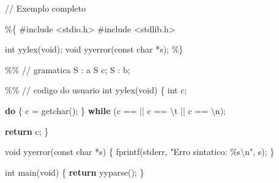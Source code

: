 \documentclass[
  brazilian,
  letterpaper,
]{book}
\newenvironment{Shaded}{\begin{snugshade}}{\end{snugshade}}
\newcommand{\AttributeTok}[1]{\textcolor[rgb]{0.40,0.45,0.13}{#1}}
\newcommand{\BaseNTok}[1]{\textcolor[rgb]{0.68,0.00,0.00}{#1}}
\newcommand{\CharTok}[1]{\textcolor[rgb]{0.13,0.47,0.30}{#1}}
\newcommand{\CommentTok}[1]{\textcolor[rgb]{0.37,0.37,0.37}{#1}}
\newcommand{\ControlFlowTok}[1]{\textcolor[rgb]{0.00,0.23,0.31}{\textbf{#1}}}
\newcommand{\DataTypeTok}[1]{\textcolor[rgb]{0.68,0.00,0.00}{#1}}
\newcommand{\ImportTok}[1]{\textcolor[rgb]{0.00,0.46,0.62}{#1}}
\newcommand{\NormalTok}[1]{\textcolor[rgb]{0.00,0.23,0.31}{#1}}
\newcommand{\OperatorTok}[1]{\textcolor[rgb]{0.37,0.37,0.37}{#1}}
\newcommand{\PreprocessorTok}[1]{\textcolor[rgb]{0.68,0.00,0.00}{#1}}
\newcommand{\SpecialCharTok}[1]{\textcolor[rgb]{0.37,0.37,0.37}{#1}}
\newcommand{\StringTok}[1]{\textcolor[rgb]{0.13,0.47,0.30}{#1}}
\theoremstyle{plain}
\theoremstyle{definition}
\theoremstyle{remark}
\begin{document}
\begin{Shaded}
\begin{Highlighting}[]
\CommentTok{// Exemplo completo}

\BaseNTok{\%\{}
\PreprocessorTok{\#include }\ImportTok{\textless{}stdio.h\textgreater{}}
\PreprocessorTok{\#include }\ImportTok{\textless{}stdlib.h\textgreater{}}

\DataTypeTok{int}\NormalTok{ yylex}\OperatorTok{(}\DataTypeTok{void}\OperatorTok{);}
\DataTypeTok{void}\NormalTok{ yyerror}\OperatorTok{(}\AttributeTok{const} \DataTypeTok{char} \OperatorTok{*}\NormalTok{s}\OperatorTok{);}
\BaseNTok{\%\}}

\BaseNTok{\%\%}
\CommentTok{// gramatica}
\StringTok{S }\NormalTok{: }\CharTok{\textquotesingle{}a\textquotesingle{}}\NormalTok{ S }\CharTok{\textquotesingle{}c\textquotesingle{}}\NormalTok{;}
\StringTok{S }\NormalTok{: }\CharTok{\textquotesingle{}b\textquotesingle{}}\NormalTok{;}

\BaseNTok{\%\%}
\CommentTok{// codigo do usuario}
\DataTypeTok{int}\NormalTok{ yylex}\OperatorTok{(}\DataTypeTok{void}\OperatorTok{)} \OperatorTok{\{}
    \DataTypeTok{int}\NormalTok{ c}\OperatorTok{;}

    \ControlFlowTok{do} \OperatorTok{\{}
\NormalTok{        c }\OperatorTok{=}\NormalTok{ getchar}\OperatorTok{();}
    \OperatorTok{\}} \ControlFlowTok{while} \OperatorTok{(}\NormalTok{c }\OperatorTok{==} \CharTok{\textquotesingle{} \textquotesingle{}} \OperatorTok{||}\NormalTok{ c }\OperatorTok{==} \CharTok{\textquotesingle{}}\SpecialCharTok{\textbackslash{}t}\CharTok{\textquotesingle{}} \OperatorTok{||}\NormalTok{ c }\OperatorTok{==} \CharTok{\textquotesingle{}}\SpecialCharTok{\textbackslash{}n}\CharTok{\textquotesingle{}}\OperatorTok{);}

    \ControlFlowTok{return}\NormalTok{ c}\OperatorTok{;}
\OperatorTok{\}}

\DataTypeTok{void}\NormalTok{ yyerror}\OperatorTok{(}\AttributeTok{const} \DataTypeTok{char} \OperatorTok{*}\NormalTok{s}\OperatorTok{)} \OperatorTok{\{}
\NormalTok{    fprintf}\OperatorTok{(}\NormalTok{stderr}\OperatorTok{,} \StringTok{"Erro sintatico: }\SpecialCharTok{\%s\textbackslash{}n}\StringTok{"}\OperatorTok{,}\NormalTok{ s}\OperatorTok{);}
\OperatorTok{\}}

\DataTypeTok{int}\NormalTok{ main}\OperatorTok{(}\DataTypeTok{void}\OperatorTok{)} \OperatorTok{\{}
    \ControlFlowTok{return}\NormalTok{ yyparse}\OperatorTok{();}
\OperatorTok{\}}
\end{Highlighting}
\end{Shaded}
\end{document}
